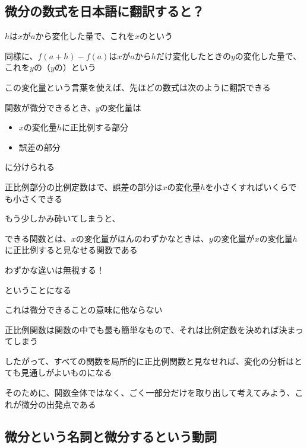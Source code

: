 \documentclass[../book_infinite_continuous_math]{subfiles}
\begin{document}
\sectionline
\subsection{微分の数式を日本語に翻訳すると？}

$h$は$x$が$a$から変化した量で、これを$x$のという

同様に、$f(a+h) - f(a)$は$x$が$a$から$h$だけ変化したときの$y$の変化した量で、これを$y$の（$y$の）という

この変化量という言葉を使えば、先ほどの数式は次のように翻訳できる

\br

\begin{screen}
  関数が微分できるとき、$y$の変化量は
  \begin{itemize}
    \item $x$の変化量$h$に正比例する部分
    \item 誤差の部分
  \end{itemize}
  に分けられる

  正比例部分の比例定数はで、誤差の部分は$x$の変化量$h$を小さくすればいくらでも小さくできる
\end{screen}

\br

もう少しかみ砕いてしまうと、

\br

\begin{screen}
  できる関数とは、$x$の変化量がほんのわずかなときは、$y$の変化量が$x$の変化量$h$に正比例すると見なせる関数である

  わずかな違いは無視する！
\end{screen}

\br

ということになる

これは微分できることの意味に他ならない

\br

正比例関数は関数の中でも最も簡単なもので、それは比例定数を決めれば決まってしまう

したがって、すべての関数を局所的に正比例関数と見なせれば、変化の分析はとても見通しがよいものになる

そのために、関数全体ではなく、ごく一部分だけを取り出して考えてみよう、これが微分の出発点である

\sectionline
\subsection{微分という名詞と微分するという動詞}
\end{document}
